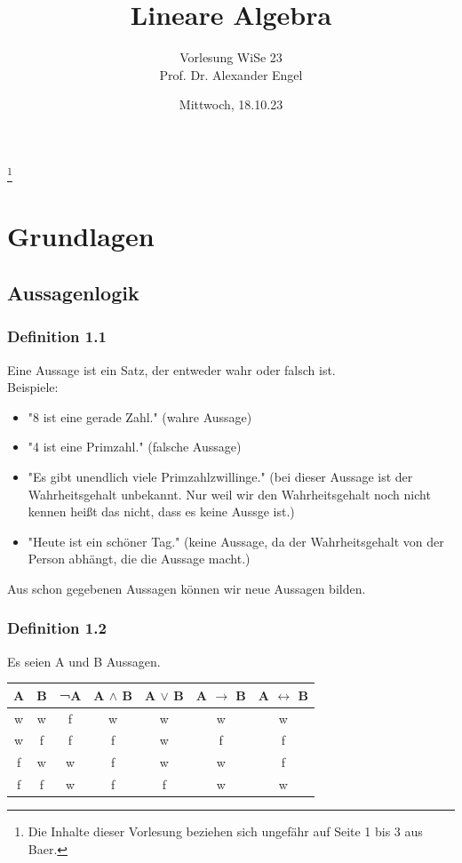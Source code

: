 \documentclass{article}
\title{Lineare Algebra}
\author{Vorlesung WiSe 23 \\ Prof. Dr. Alexander Engel}
\begin{document}
\maketitle

\date{Mittwoch, 18.10.23} \footnote[1]{Die Inhalte dieser Vorlesung beziehen sich ungefähr auf Seite 1 bis 3 aus Baer.}

\section{Grundlagen}
\subsection{Aussagenlogik}
\subsubsection*{Definition 1.1} Eine Aussage ist ein Satz, der entweder wahr oder falsch ist.\\
Beispiele:
\begin{itemize}
    \item "8 ist eine gerade Zahl." (wahre Aussage)
    \item "4 ist eine Primzahl." (falsche Aussage)
    \item "Es gibt unendlich viele Primzahlzwillinge." (bei dieser Aussage ist der Wahrheitsgehalt unbekannt. Nur weil wir den Wahrheitsgehalt noch nicht kennen heißt das nicht, dass es keine Aussge ist.)
    \item "Heute ist ein schöner Tag." (keine Aussage, da der Wahrheitsgehalt von der Person abhängt, die die Aussage macht.)
\end{itemize}

Aus schon gegebenen Aussagen können wir neue Aussagen bilden.
\subsubsection*{Definition 1.2}
Es seien A und B Aussagen. 

\begin{center}
    \begin{tabular}{|c|c|c|c|c|c|c|}
        \hline
        A & B & ¬A & A $\wedge$ B & A $\vee$ B & A $\rightarrow$ B & A $\leftrightarrow$ B \\
        \hline
        \hline
        w & w & f & w & w & w & w \\
        w & f & f & f & w & f & f \\
        f & w & w & f & w & w & f \\
        f & f & w & f & f & w & w \\
        \hline
    \end{tabular}
\end{center}
\end{document}
